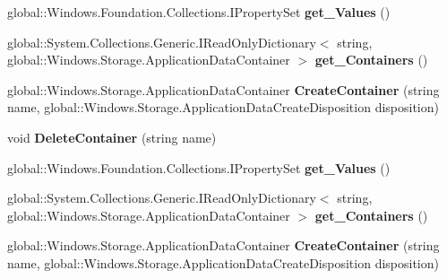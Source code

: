\begin{DoxyCompactItemize}
global\+::\+Windows.\+Foundation.\+Collections.\+I\+Property\+Set {\bfseries get\+\_\+\+Values} ()
\item 
\mbox{\label{interface_windows_1_1_storage_1_1_i_application_data_container_a08ebbc78fa92d7dcaea9b36261b01f7c}} 
global\+::\+System.\+Collections.\+Generic.\+I\+Read\+Only\+Dictionary$<$ string, global\+::\+Windows.\+Storage.\+Application\+Data\+Container $>$ {\bfseries get\+\_\+\+Containers} ()
\item 
\mbox{\label{interface_windows_1_1_storage_1_1_i_application_data_container_ad3ca0020aa9ff4735e605413e9948f61}} 
global\+::\+Windows.\+Storage.\+Application\+Data\+Container {\bfseries Create\+Container} (string name, global\+::\+Windows.\+Storage.\+Application\+Data\+Create\+Disposition disposition)
\item 
\mbox{\label{interface_windows_1_1_storage_1_1_i_application_data_container_a900abad7d6853503cdd95e3d82cd2867}} 
void {\bfseries Delete\+Container} (string name)
\item 
\mbox{\label{interface_windows_1_1_storage_1_1_i_application_data_container_a6a8a475818330878971aadb509a49dde}} 
global\+::\+Windows.\+Foundation.\+Collections.\+I\+Property\+Set {\bfseries get\+\_\+\+Values} ()
\item 
\mbox{\label{interface_windows_1_1_storage_1_1_i_application_data_container_a08ebbc78fa92d7dcaea9b36261b01f7c}} 
global\+::\+System.\+Collections.\+Generic.\+I\+Read\+Only\+Dictionary$<$ string, global\+::\+Windows.\+Storage.\+Application\+Data\+Container $>$ {\bfseries get\+\_\+\+Containers} ()
\item 
\mbox{\label{interface_windows_1_1_storage_1_1_i_application_data_container_ad3ca0020aa9ff4735e605413e9948f61}} 
global\+::\+Windows.\+Storage.\+Application\+Data\+Container {\bfseries Create\+Container} (string name, global\+::\+Windows.\+Storage.\+Application\+Data\+Create\+Disposition disposition)

\end{DoxyCompactItemize}
